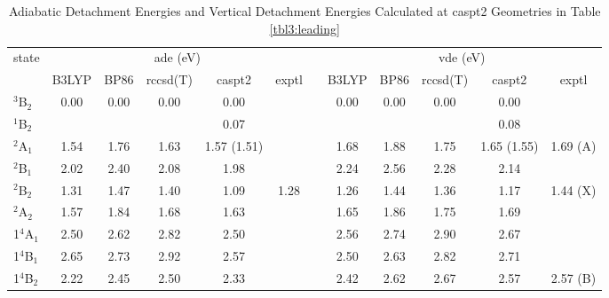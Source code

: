 \begin{refsection}
\begin{landscape}
	\begin{table}[htb!]
	\centering
	\setlength\LTcapwidth{\textwidth} %
	\setlength\LTleft{0pt}            %
	\setlength\LTright{0pt}           %
	\begin{threeparttable}
	\caption{Adiabatic Detachment Energies and Vertical Detachment Energies Calculated at \acrshort{caspt2} Geometries in Table \ref{tbl3:leading}}
	\label{tbl3:DE}                                                                
	\begin{tabular}{@{\extracolsep{\fill}}lccccccccccc@{}}
	\toprule
	\multirow{2}{*}{state} & \multicolumn{5}{c}{\acrshort{ade} (eV)}&  	   & \multicolumn{5}{c}{\acrshort{vde} (eV)}            \\ \cmidrule(lr){2-6} \cmidrule(l){8-12} 
				  & B3LYP & BP86 & \acrshort{rccsd}(T) & \acrshort{caspt2}      & exptl  &  & B3LYP & BP86 & \acrshort{rccsd}(T) & \acrshort{caspt2}      & exptl    \\ \cmidrule(r){1-6} \cmidrule(l){8-12} 
	$^3$B$_2$     & 0.00  & 0.00 & 0.00     & 0.00        &        &  & 0.00  & 0.00 & 0.00     & 0.00        &          \\
	$^1$B$_2$     &       &      &          & 0.07        &        &  &       &      &          & 0.08        &          \\
	$^2$A$_1$     & 1.54  & 1.76 & 1.63     & 1.57 (1.51) &        &  & 1.68  & 1.88 & 1.75     & 1.65 (1.55) & 1.69 (A) \\
	$^2$B$_1$     & 2.02  & 2.40 & 2.08     & 1.98        &        &  & 2.24  & 2.56 & 2.28     & 2.14        &          \\
	$^2$B$_2$     & 1.31  & 1.47 & 1.40     & 1.09        & 1.28   &  & 1.26  & 1.44 & 1.36     & 1.17        & 1.44 (X) \\
	$^2$A$_2$     & 1.57  & 1.84 & 1.68     & 1.63        &        &  & 1.65  & 1.86 & 1.75     & 1.69        &          \\
	1$^4$A$_1$    & 2.50  & 2.62 & 2.82     & 2.50        &        &  & 2.56  & 2.74 & 2.90     & 2.67        &          \\
	1$^4$B$_1$    & 2.65  & 2.73 & 2.92     & 2.57        &        &  & 2.50  & 2.63 & 2.82     & 2.71        &          \\
	1$^4$B$_2$    & 2.22  & 2.45 & 2.50     & 2.33        &        &  & 2.42  & 2.62 & 2.67     & 2.57        & 2.57 (B) \\

\end{tabular}
\end{threeparttable}
\end{table}
\end{landscape}
\end{refsection}
